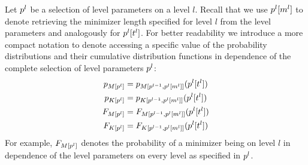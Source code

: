 \documentclass[a4paper,titlepage,onecolumn,oneside,12pt,nenglish,titlepage=firstiscover]{scrbook}
\theoremstyle{plain} %
\theoremstyle{definition} %
\theoremstyle{remark} %
\theoremstyle{plain}
\newcommand{\minimizerLength}{m}
\newcommand{\threshold}{t}
\newcommand{\level}{l}
\begin{document}
Let $\levelParameters{\level}$ be a selection of level parameters on a level $\level$. Recall that we use $\parameterAccess{\level}{\minimizerLength}{\level}$ to denote retrieving the minimizer length specified for level $\level$ from the level parameters and analogously for $\parameterAccess{\level}{\threshold}{\level}$. For better readability we introduce a more compact notation to denote accessing a specific value of the probability distributions and their cumulative distribution functions in dependence of the complete selection of level parameters $\levelParameters{\level}$:
\begin{align}
	\probabilityDistribution{\compactZV{M}{\levelParameters{\level}}} &= \probabilityDistribution{\manualZV{M}{\levelParameters{\level-1}}{\parameterAccess{\level}{\minimizerLength}{\level}}}(\parameterAccess{\level}{\threshold}{\level})
	\\
	\probabilityDistribution{\compactZV{K}{\levelParameters{\level}}} &= \probabilityDistribution{\manualZV{K}{\levelParameters{\level-1}}{\parameterAccess{\level}{\minimizerLength}{\level}}}(\parameterAccess{\level}{\threshold}{\level})
	\\
	\CDF{\compactZV{M}{\levelParameters{\level}}} &= \CDF{\manualZV{M}{\levelParameters{\level-1}}{\parameterAccess{\level}{\minimizerLength}{\level}}}(\parameterAccess{\level}{\threshold}{\level})
	\\
	\CDF{\compactZV{K}{\levelParameters{\level}}} &= \CDF{\manualZV{K}{\levelParameters{\level-1}}{\parameterAccess{\level}{\minimizerLength}{\level}}}(\parameterAccess{\level}{\threshold}{\level})
\end{align}
For example, $\CDF{\compactZV{M}{\levelParameters{\level}}}$ denotes the probability of a minimizer being \infrequent on level $\level$ in dependence of the level parameters on every level as specified in $\levelParameters{\level}$.
\end{document}
